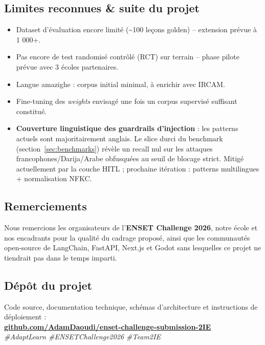 \documentclass[11pt,a4paper]{article}
\begin{document}
\subsection{Limites reconnues \& suite du projet}

\begin{itemize}
\item Dataset d'évaluation encore limité (\textasciitilde 100 leçons golden) -- extension prévue à 1 000+.
\item Pas encore de test randomisé contrôlé (RCT) sur terrain -- phase pilote prévue avec 3 écoles partenaires.
\item Langue amazighe : corpus initial minimal, à enrichir avec IRCAM.
\item Fine-tuning des \textit{weights} envisagé une fois un corpus supervisé suffisant constitué.
\item \textbf{Couverture linguistique des guardrails d'injection} : les
      patterns actuels sont majoritairement anglais. Le slice durci du
      benchmark (section~\ref{sec:benchmarks}) révèle un recall nul sur
      les attaques francophones/Darija/Arabe obfusquées au seuil de blocage
      strict. Mitigé actuellement par la couche HITL ; prochaine itération :
      patterns multilingues + normalisation NFKC.
\end{itemize}

\subsection{Remerciements}

Nous remercions les organisateurs de l'\textbf{ENSET Challenge 2026}, notre école
et nos encadrants pour la qualité du cadrage proposé, ainsi que les communautés
open-source de LangChain, FastAPI, Next.js et Godot sans lesquelles ce projet ne
tiendrait pas dans le temps imparti.

\vspace{0.8em}

\subsection{Dépôt du projet}

\begin{tcolorbox}[colback=white, colframe=primary, boxrule=0.8pt, arc=2pt,
  left=12pt,right=12pt,top=10pt,bottom=10pt]
\begin{center}
{\small\color{mute}Code source, documentation technique, schémas d'architecture et
instructions de déploiement :}\\[8pt]
{\Large\bfseries\color{primary}\href{https://github.com/AdamDaoudi/enset-challenge-submission-2IE}{github.com/AdamDaoudi/enset-challenge-submission-2IE}}\\[4pt]
{\footnotesize\color{mute}\itshape\#AdaptLearn \quad\#ENSETChallenge2026 \quad\#Team2IE}
\end{center}
\end{tcolorbox}
\end{document}
